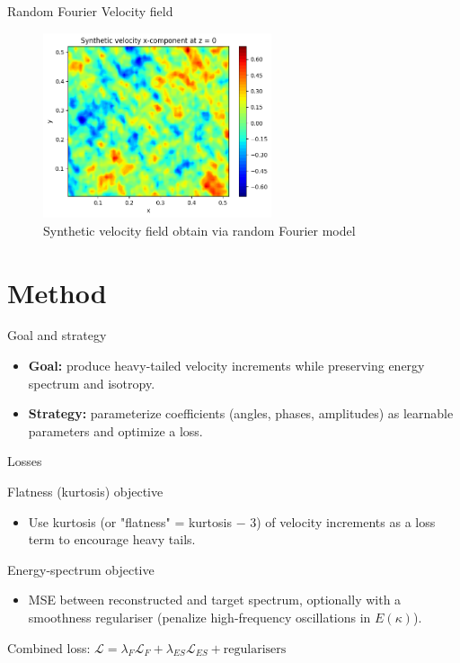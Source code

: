 \documentclass[11pt]{beamer}
\begin{document}
\begin{frame}{Random Fourier Velocity field}
  \begin{figure}
    \centering
    \includegraphics[width=0.6\textwidth]{illustrations/Velocity_Example.png}
    \caption{Synthetic velocity field obtain via random Fourier model}
  \end{figure}
\end{frame}

\section{Method}
\begin{frame}{Goal and strategy}
  \begin{itemize}
    \item \textbf{Goal:} produce heavy-tailed velocity increments while preserving energy spectrum and isotropy.
    \item \textbf{Strategy:} parameterize coefficients (angles, phases, amplitudes) as learnable parameters and optimize a loss.
  \end{itemize}
\end{frame}

\begin{frame}{Losses}
  \begin{block}{Flatness (kurtosis) objective}
    \begin{itemize}
      \item Use kurtosis (or "flatness" = kurtosis $-$ 3) of velocity increments as a loss term to encourage heavy tails.
    \end{itemize}
  \end{block}
  \begin{block}{Energy-spectrum objective}
    \begin{itemize}
      \item MSE between reconstructed and target spectrum, optionally with a smoothness regulariser (penalize high-frequency oscillations in $E(\kappa)$).
    \end{itemize}
  \end{block}
  \vfill
  \centering Combined loss: $\mathcal{L}=\lambda_F\mathcal{L}_F + \lambda_{ES}\mathcal{L}_{ES} + \text{regularisers}$
\end{frame}
\end{document}
